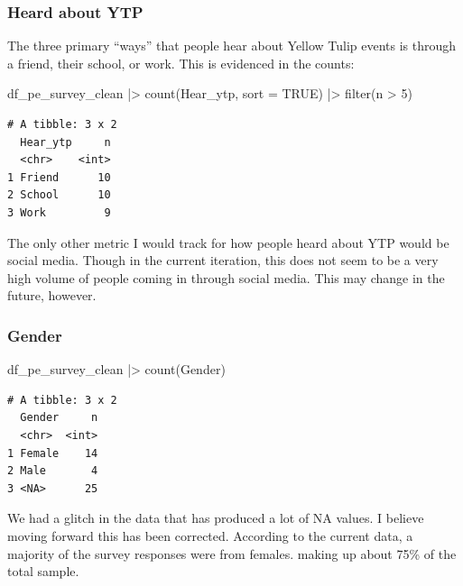 \documentclass[
  letterpaper,
  DIV=11,
  numbers=noendperiod]{scrartcl}
\newenvironment{Shaded}{\begin{snugshade}}{\end{snugshade}}
\newcommand{\AttributeTok}[1]{\textcolor[rgb]{0.40,0.45,0.13}{#1}}
\newcommand{\ConstantTok}[1]{\textcolor[rgb]{0.56,0.35,0.01}{#1}}
\newcommand{\DecValTok}[1]{\textcolor[rgb]{0.68,0.00,0.00}{#1}}
\newcommand{\FunctionTok}[1]{\textcolor[rgb]{0.28,0.35,0.67}{#1}}
\newcommand{\NormalTok}[1]{\textcolor[rgb]{0.00,0.23,0.31}{#1}}
\newcommand{\SpecialCharTok}[1]{\textcolor[rgb]{0.37,0.37,0.37}{#1}}
\begin{document}
\hypertarget{heard-about-ytp}{%
\subsubsection{Heard about YTP}\label{heard-about-ytp}}

The three primary ``ways'' that people hear about Yellow Tulip events is
through a friend, their school, or work. This is evidenced in the
counts:

\begin{Shaded}
\begin{Highlighting}[]
\NormalTok{df\_pe\_survey\_clean }\SpecialCharTok{|\textgreater{}} 
  \FunctionTok{count}\NormalTok{(Hear\_ytp, }\AttributeTok{sort =} \ConstantTok{TRUE}\NormalTok{) }\SpecialCharTok{|\textgreater{}} 
  \FunctionTok{filter}\NormalTok{(n }\SpecialCharTok{\textgreater{}} \DecValTok{5}\NormalTok{)}
\end{Highlighting}
\end{Shaded}

\begin{verbatim}
# A tibble: 3 x 2
  Hear_ytp     n
  <chr>    <int>
1 Friend      10
2 School      10
3 Work         9
\end{verbatim}

The only other metric I would track for how people heard about YTP would
be social media. Though in the current iteration, this does not seem to
be a very high volume of people coming in through social media. This may
change in the future, however.

\hypertarget{gender}{%
\subsubsection{Gender}\label{gender}}

\begin{Shaded}
\begin{Highlighting}[]
\NormalTok{df\_pe\_survey\_clean }\SpecialCharTok{|\textgreater{}} 
  \FunctionTok{count}\NormalTok{(Gender)}
\end{Highlighting}
\end{Shaded}

\begin{verbatim}
# A tibble: 3 x 2
  Gender     n
  <chr>  <int>
1 Female    14
2 Male       4
3 <NA>      25
\end{verbatim}

We had a glitch in the data that has produced a lot of NA values. I
believe moving forward this has been corrected. According to the current
data, a majority of the survey responses were from females. making up
about 75\% of the total sample.
\end{document}
